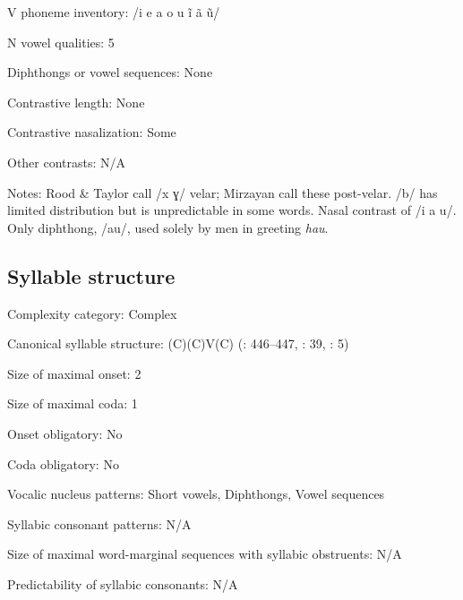 {\begin{appendixdesc}
\item[V phoneme inventory:] /i e a o u ĩ ã ũ/

\item[N vowel qualities:] 5

\item[Diphthongs or vowel sequences:] None

\item[Contrastive length:] None

\item[Contrastive nasalization:] Some

\item[Other contrasts:] N/A

\item[Notes:] Rood \& Taylor call /x ɣ/ velar; Mirzayan call these post-velar. /b/ has limited distribution but is unpredictable in some words. Nasal contrast of /i a u/. Only diphthong, /au/, used solely by men in greeting \textit{hau}.
\end{appendixdesc}
\subsection*{Syllable structure}
\begin{appendixdesc}

\item[Complexity category:] Complex

\item[Canonical syllable structure:] (C)(C)V(C) (\citealt{RoodTaylor1996}: 446--447, \citealt{Mirzayan2010}: 39, \citealt{Ingham2003}: 5)

\item[Size of maximal onset:] 2

\item[Size of maximal coda:] 1

\item[Onset obligatory:] No

\item[Coda obligatory:] No

\item[Vocalic nucleus patterns:] Short vowels, Diphthongs, Vowel sequences

\item[Syllabic consonant patterns:] N/A

\item[Size of maximal word-marginal sequences with syllabic obstruents:] N/A

\item[Predictability of syllabic consonants:] N/A


\end{appendixdesc}}
